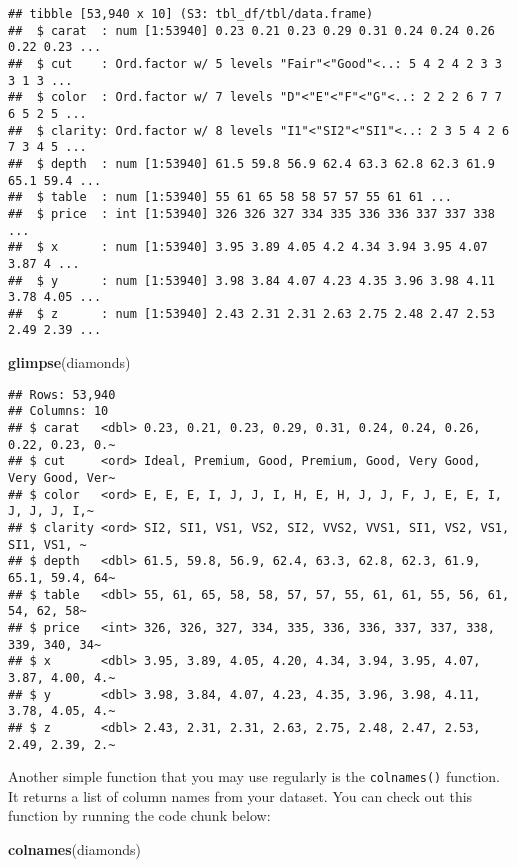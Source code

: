 \documentclass[
]{article}
\newenvironment{Shaded}{\begin{snugshade}}{\end{snugshade}}
\newcommand{\FunctionTok}[1]{\textcolor[rgb]{0.13,0.29,0.53}{\textbf{#1}}}
\newcommand{\NormalTok}[1]{#1}
\begin{document}
\begin{verbatim}
## tibble [53,940 x 10] (S3: tbl_df/tbl/data.frame)
##  $ carat  : num [1:53940] 0.23 0.21 0.23 0.29 0.31 0.24 0.24 0.26 0.22 0.23 ...
##  $ cut    : Ord.factor w/ 5 levels "Fair"<"Good"<..: 5 4 2 4 2 3 3 3 1 3 ...
##  $ color  : Ord.factor w/ 7 levels "D"<"E"<"F"<"G"<..: 2 2 2 6 7 7 6 5 2 5 ...
##  $ clarity: Ord.factor w/ 8 levels "I1"<"SI2"<"SI1"<..: 2 3 5 4 2 6 7 3 4 5 ...
##  $ depth  : num [1:53940] 61.5 59.8 56.9 62.4 63.3 62.8 62.3 61.9 65.1 59.4 ...
##  $ table  : num [1:53940] 55 61 65 58 58 57 57 55 61 61 ...
##  $ price  : int [1:53940] 326 326 327 334 335 336 336 337 337 338 ...
##  $ x      : num [1:53940] 3.95 3.89 4.05 4.2 4.34 3.94 3.95 4.07 3.87 4 ...
##  $ y      : num [1:53940] 3.98 3.84 4.07 4.23 4.35 3.96 3.98 4.11 3.78 4.05 ...
##  $ z      : num [1:53940] 2.43 2.31 2.31 2.63 2.75 2.48 2.47 2.53 2.49 2.39 ...
\end{verbatim}

\begin{Shaded}
\begin{Highlighting}[]
\FunctionTok{glimpse}\NormalTok{(diamonds)}
\end{Highlighting}
\end{Shaded}

\begin{verbatim}
## Rows: 53,940
## Columns: 10
## $ carat   <dbl> 0.23, 0.21, 0.23, 0.29, 0.31, 0.24, 0.24, 0.26, 0.22, 0.23, 0.~
## $ cut     <ord> Ideal, Premium, Good, Premium, Good, Very Good, Very Good, Ver~
## $ color   <ord> E, E, E, I, J, J, I, H, E, H, J, J, F, J, E, E, I, J, J, J, I,~
## $ clarity <ord> SI2, SI1, VS1, VS2, SI2, VVS2, VVS1, SI1, VS2, VS1, SI1, VS1, ~
## $ depth   <dbl> 61.5, 59.8, 56.9, 62.4, 63.3, 62.8, 62.3, 61.9, 65.1, 59.4, 64~
## $ table   <dbl> 55, 61, 65, 58, 58, 57, 57, 55, 61, 61, 55, 56, 61, 54, 62, 58~
## $ price   <int> 326, 326, 327, 334, 335, 336, 336, 337, 337, 338, 339, 340, 34~
## $ x       <dbl> 3.95, 3.89, 4.05, 4.20, 4.34, 3.94, 3.95, 4.07, 3.87, 4.00, 4.~
## $ y       <dbl> 3.98, 3.84, 4.07, 4.23, 4.35, 3.96, 3.98, 4.11, 3.78, 4.05, 4.~
## $ z       <dbl> 2.43, 2.31, 2.31, 2.63, 2.75, 2.48, 2.47, 2.53, 2.49, 2.39, 2.~
\end{verbatim}

Another simple function that you may use regularly is the
\texttt{colnames()} function. It returns a list of column names from
your dataset. You can check out this function by running the code chunk
below:

\begin{Shaded}
\begin{Highlighting}[]
\FunctionTok{colnames}\NormalTok{(diamonds)}
\end{Highlighting}
\end{Shaded}
\end{document}
